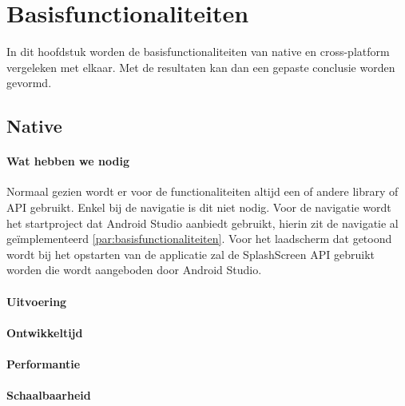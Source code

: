 
\chapter{Basisfunctionaliteiten}%
\label{ch:basisfunctionaliteiten}

In dit hoofdstuk worden de basisfunctionaliteiten van native en cross-platform vergeleken met elkaar. 
Met de resultaten kan dan een gepaste conclusie worden gevormd.

\section{Native}
\subsubsection{Wat hebben we nodig}
Normaal gezien wordt er voor de functionaliteiten altijd een of andere library of API gebruikt. 
Enkel bij de navigatie is dit niet nodig. Voor de navigatie wordt het 
startproject dat Android Studio aanbiedt gebruikt, hierin zit de navigatie al geïmplementeerd 
\ref{par:basisfunctionaliteiten}. Voor het laadscherm dat getoond wordt bij het opstarten van 
de applicatie zal de SplashScreen API gebruikt worden die wordt aangeboden door Android Studio.

\subsubsection{Uitvoering}



\subsubsection{Ontwikkeltijd}



\subsubsection{Performantie}



\subsubsection{Schaalbaarheid}


